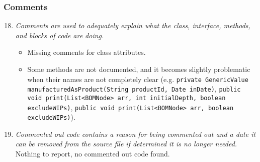 	\subsubsection{Comments}
		\begin{enumerate}
			\setcounter{enumi}{17}
			\item \textit{Comments are used to adequately explain what the class, interface, methods, and blocks of code are doing.}
			\begin{itemize}
				\item Missing comments for class attributes.
				\item Some methods are not documented, and it becomes slightly problematic when their names are not completely clear (e.g.\newline
				\texttt{private GenericValue manufacturedAsProduct(String productId, Date inDate)},\newline
				\texttt{public void print(List<BOMNode> arr, int initialDepth, boolean excludeWIPs)},\newline
				\texttt{public void print(List<BOMNode> arr, boolean excludeWIPs)}).
			\end{itemize}

			\item \textit{Commented out code contains a reason for being commented out and a date it can be removed from the source file if determined it is no longer needed.}\newline
			Nothing to report, no commented out code found. %
		\end{enumerate}

